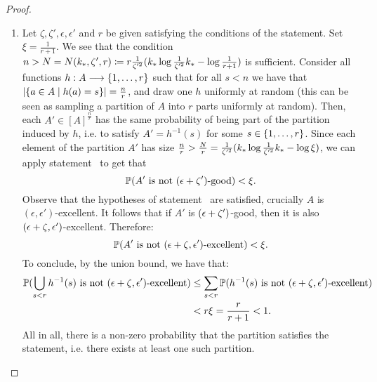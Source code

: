 \begin{lemma}
\begin{proof}
\begin{enumerate}[label={\Roman*}., ref={\Roman*}, font=\rmfamily]
                \item Let $\zeta, \zeta', \epsilon, \epsilon'$ and $r$ be given satisfying the conditions of the statement.
                    Set $\xi = \frac{1}{r + 1}$.
                    We see that the condition
                    $n > N = N( k_{*}, \zeta', r ) \coloneqq r \frac{1}{\zeta'^2}( k_* \log{\frac{1}{\zeta'^2}k_*} - \log{\frac{1}{r + 1}} )$
                    is sufficient.
                    Consider all functions $h: A \longrightarrow \{ 1, \dots, r \}$ such that
                    for all $s < n$ we have that $| \{ a \in A \mid h(a) = s \} | = \frac{n}{r}$,
                    and draw one $h$ uniformly at random (this can be seen as sampling a partition of $A$ into $r$ parts
                    uniformly at random).
                    Then, each $A' \in [A]^\frac{n}{r}$ has the same probability of being part of the partition
                    induced by $h$, i.e. to satisfy $A' = h^{-1}(s)$ for some $s \in \{ 1, \dots, r \}$.
                    Since each element of the partition $A'$ has size
                    $\frac{n}{r} > \frac{N}{r} = \frac{1}{\zeta'^2}( k_* \log{\frac{1}{\zeta'^2}k_*} - \log{\xi} )$,
                    we can apply statement ~to get that
                    \[
                        \mathbb{P}( A' \text{ is not } ( \epsilon + \zeta' )\text{-good} ) < \xi.
                    \]
                    Observe that the hypotheses of statement ~are satisfied,
                    crucially $A$ is $(\epsilon, \epsilon')$-excellent.
                    It follows that if $A'$ is $( \epsilon + \zeta' )$-good, then it is also $( \epsilon + \zeta, \epsilon' )$-excellent.
                    Therefore:
                    \[
                        \mathbb{P}( A' \text{ is not } ( \epsilon + \zeta, \epsilon' )\text{-excellent} ) < \xi.
                    \]
                    To conclude, by the union bound, we have that:
                    \begin{align*}
                        \mathbb{P}( \bigcup_{s < r} h^{-1}(s) \text{ is not } ( \epsilon + \zeta, \epsilon' )\text{-excellent} )
                            & \leq \sum_{s < r} \mathbb{P}( h^{-1}(s) \text{ is not } ( \epsilon + \zeta, \epsilon' )\text{-excellent} ) \\
                            & < r \xi = \frac{r}{r+1} < 1.
                    \end{align*}
                    All in all, there is a non-zero probability that the partition satisfies the statement,
                    i.e. there exists at least one such partition. \qedhere
                \end{enumerate}
            \end{proof}
        \end{lemma}

